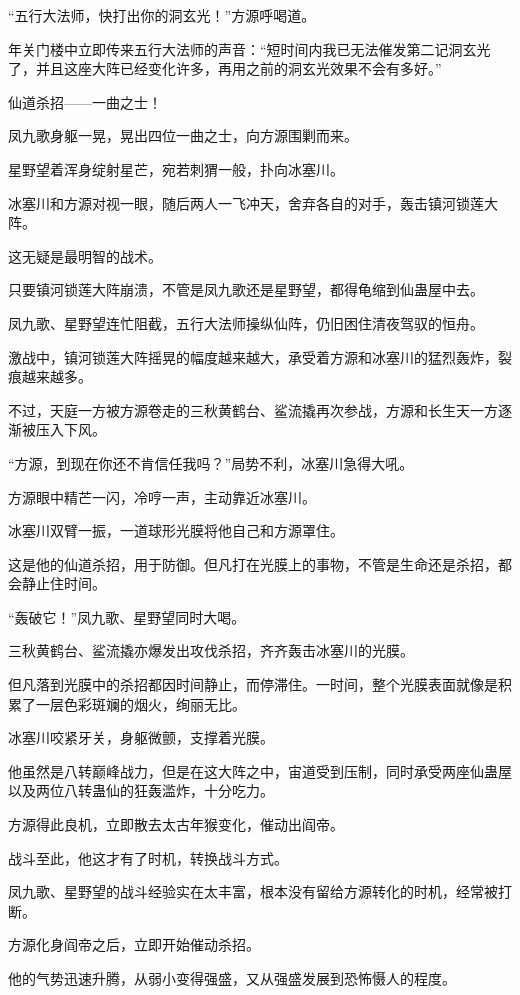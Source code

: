 \begin{this_body}
“五行大法师，快打出你的洞玄光！”方源呼喝道。

年关门楼中立即传来五行大法师的声音：“短时间内我已无法催发第二记洞玄光了，并且这座大阵已经变化许多，再用之前的洞玄光效果不会有多好。”

仙道杀招——一曲之士！

凤九歌身躯一晃，晃出四位一曲之士，向方源围剿而来。

星野望着浑身绽射星芒，宛若刺猬一般，扑向冰塞川。

冰塞川和方源对视一眼，随后两人一飞冲天，舍弃各自的对手，轰击镇河锁莲大阵。

这无疑是最明智的战术。

只要镇河锁莲大阵崩溃，不管是凤九歌还是星野望，都得龟缩到仙蛊屋中去。

凤九歌、星野望连忙阻截，五行大法师操纵仙阵，仍旧困住清夜驾驭的恒舟。

激战中，镇河锁莲大阵摇晃的幅度越来越大，承受着方源和冰塞川的猛烈轰炸，裂痕越来越多。

不过，天庭一方被方源卷走的三秋黄鹤台、鲨流撬再次参战，方源和长生天一方逐渐被压入下风。

“方源，到现在你还不肯信任我吗？”局势不利，冰塞川急得大吼。

方源眼中精芒一闪，冷哼一声，主动靠近冰塞川。

冰塞川双臂一振，一道球形光膜将他自己和方源罩住。

这是他的仙道杀招，用于防御。但凡打在光膜上的事物，不管是生命还是杀招，都会静止住时间。

“轰破它！”凤九歌、星野望同时大喝。

三秋黄鹤台、鲨流撬亦爆发出攻伐杀招，齐齐轰击冰塞川的光膜。

但凡落到光膜中的杀招都因时间静止，而停滞住。一时间，整个光膜表面就像是积累了一层色彩斑斓的烟火，绚丽无比。

冰塞川咬紧牙关，身躯微颤，支撑着光膜。

他虽然是八转巅峰战力，但是在这大阵之中，宙道受到压制，同时承受两座仙蛊屋以及两位八转蛊仙的狂轰滥炸，十分吃力。

方源得此良机，立即散去太古年猴变化，催动出阎帝。

战斗至此，他这才有了时机，转换战斗方式。

凤九歌、星野望的战斗经验实在太丰富，根本没有留给方源转化的时机，经常被打断。

方源化身阎帝之后，立即开始催动杀招。

他的气势迅速升腾，从弱小变得强盛，又从强盛发展到恐怖慑人的程度。


\end{this_body}
